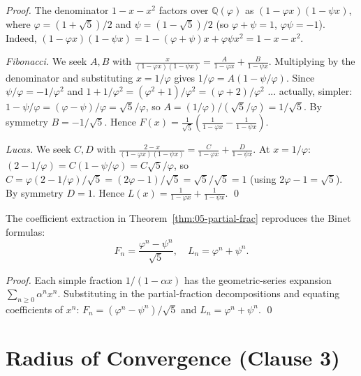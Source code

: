 \begin{proof}
The denominator $1 - x - x^2$ factors over $\mathbb{Q}(\varphi)$ as
$(1 - \varphi x)(1 - \psi x)$, where $\varphi = (1+\sqrt{5})/2$ and
$\psi = (1-\sqrt{5})/2$ (so $\varphi + \psi = 1$, $\varphi \psi = -1$).
Indeed, $(1 - \varphi x)(1 - \psi x) = 1 - (\varphi + \psi) x +
\varphi \psi x^2 = 1 - x - x^2$.

\emph{Fibonacci.} We seek $A, B$ with
$\frac{x}{(1-\varphi x)(1-\psi x)} = \frac{A}{1-\varphi x} + \frac{B}{1-\psi x}$.
Multiplying by the denominator and substituting $x = 1/\varphi$ gives
$1/\varphi = A (1 - \psi/\varphi)$. Since $\psi/\varphi = -1/\varphi^2$
and $1 + 1/\varphi^2 = (\varphi^2 + 1)/\varphi^2 = (\varphi + 2)/\varphi^2$
... actually, simpler: $1 - \psi/\varphi = (\varphi - \psi)/\varphi = \sqrt{5}/\varphi$,
so $A = (1/\varphi)/(\sqrt{5}/\varphi) = 1/\sqrt{5}$. By symmetry
$B = -1/\sqrt{5}$. Hence
$F(x) = \frac{1}{\sqrt{5}} \left(\frac{1}{1 - \varphi x} - \frac{1}{1 - \psi x}\right)$.

\emph{Lucas.} We seek $C, D$ with
$\frac{2 - x}{(1-\varphi x)(1-\psi x)} = \frac{C}{1-\varphi x} + \frac{D}{1-\psi x}$.
At $x = 1/\varphi$: $(2 - 1/\varphi) = C(1 - \psi/\varphi) = C \sqrt{5}/\varphi$,
so $C = \varphi (2 - 1/\varphi)/\sqrt{5} = (2\varphi - 1)/\sqrt{5} = \sqrt{5}/\sqrt{5} = 1$
(using $2\varphi - 1 = \sqrt{5}$). By symmetry $D = 1$. Hence
$L(x) = \frac{1}{1 - \varphi x} + \frac{1}{1 - \psi x}$. \qed
\end{proof}

\begin{corollary}
\label{cor:05-binet}
The coefficient extraction in Theorem~\ref{thm:05-partial-frac}
reproduces the Binet formulas:
\[
  F_n = \frac{\varphi^n - \psi^n}{\sqrt{5}}, \quad L_n = \varphi^n + \psi^n.
\]
\end{corollary}

\begin{proof}
Each simple fraction $1/(1 - \alpha x)$ has the geometric-series
expansion $\sum_{n \ge 0} \alpha^n x^n$. Substituting in the
partial-fraction decompositions and equating coefficients of $x^n$:
$F_n = (\varphi^n - \psi^n)/\sqrt{5}$ and $L_n = \varphi^n + \psi^n$. \qed
\end{proof}

\section{Radius of Convergence (Clause 3)}
\label{sec:05-radius}

